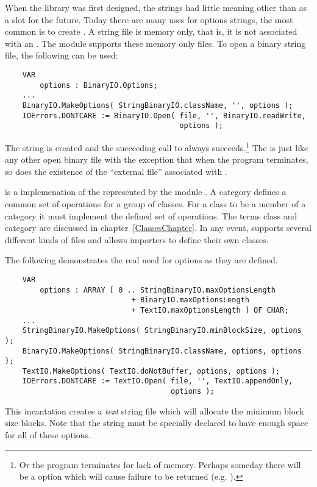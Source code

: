 When the library was first designed, the  strings
had little meaning other than as a slot for the future.  Today there
are many uses for options strings, the most common is to create
.  A string file is memory only, that is,
it is not associated with an .  The
module  supports these memory only files.
To open a binary string file, the following can be used:
\begin{verbatim}
    VAR
        options : BinaryIO.Options;
    ...
    BinaryIO.MakeOptions( StringBinaryIO.className, '', options );
    IOErrors.DONTCARE := BinaryIO.Open( file, '', BinaryIO.readWrite,
                                        options );
\end{verbatim}

The  string
is created and the succeeding call to  always
succeeds.\footnote{Or the program terminates for lack of memory.
    Perhaps someday there will be a  option
    which will cause failure to be returned (e.g. 
    ).}
The  is just like any other open binary file with the
exception that when the program terminates, so does the existence
of the ``external file'' associated with .

 is a  implemenation of
the  represented by the module .
A category defines a common set
of operations for a group of classes.  For a class to be a member
of a category it must implement the defined set of operations.
The terms class and category are discussed in 
chapter~\ref{ClassesChapter}.  In any event, 
supports several different kinds of files and allows importers
to define their own classes.  

The following demonstrates the real need for options as they
are defined.
\begin{verbatim}
    VAR
        options : ARRAY [ 0 .. StringBinaryIO.maxOptionsLength
                             + BinaryIO.maxOptionsLength
                             + TextIO.maxOptionsLength ] OF CHAR;
    ...
    StringBinaryIO.MakeOptions( StringBinaryIO.minBlockSize, options );
    BinaryIO.MakeOptions( StringBinaryIO.className, options, options );
    TextIO.MakeOptions( TextIO.doNotBuffer, options, options );
    IOErrors.DONTCARE := TextIO.Open( file, '', TextIO.appendOnly,
                                      options );
\end{verbatim}
This incantation creates a {\em text} string file which will
allocate the minimum block size blocks.  
Note that the  string must be specially declared
to have enough space for all of these options.

